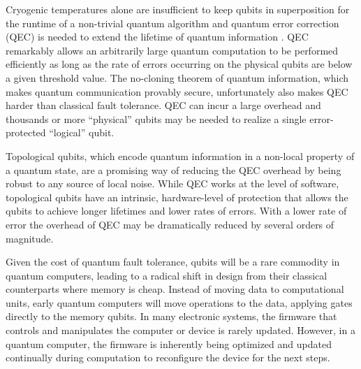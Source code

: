 \documentclass[journal]{IEEEtran}
\begin{document}
Cryogenic temperatures alone are insufficient to keep qubits in superposition for the runtime of a non-trivial quantum algorithm and quantum error correction (QEC) 
is needed to extend the lifetime of quantum information \cite{qecc}.  QEC remarkably allows an arbitrarily large quantum computation to be performed efficiently as long as the rate of errors occurring on the physical qubits are below a given threshold value. The no-cloning theorem of quantum information, which makes quantum communication provably secure, unfortunately also makes QEC harder than classical fault tolerance. QEC can incur a large overhead and thousands or more ``physical'' qubits may be needed to realize a single error-protected ``logical'' qubit. 

Topological qubits,
which  encode  quantum information in a non-local property of a quantum state, are a promising way of reducing the QEC overhead by being robust to any source of local noise.  While QEC works at the level of software, topological qubits have an intrinsic, hardware-level of protection that allows the qubits to achieve longer lifetimes and lower rates of errors.  With a lower rate of error the overhead of QEC may be dramatically reduced by several orders of magnitude.

Given the cost of quantum fault tolerance, qubits will be a rare commodity in quantum computers, leading to a radical shift in design from their classical counterparts where memory is cheap. Instead of moving data to computational units, early quantum computers will move operations to the data, applying gates directly to the memory qubits.  
In many electronic systems, the firmware that controls and manipulates the computer or device is rarely updated.  However, in a quantum computer, the firmware is inherently being optimized and updated continually during computation to reconfigure the device for the next steps.
\end{document}

